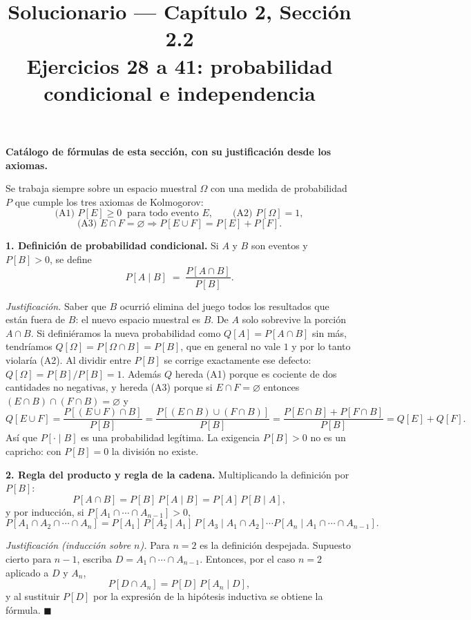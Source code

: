 \documentclass[11pt]{article}
\title{Solucionario --- Cap\'itulo 2, Secci\'on 2.2\\ Ejercicios 28 a 41: probabilidad condicional e independencia}
\author{}
\date{}
\begin{document}
\maketitle

\begin{teo}
\textbf{Cat\'alogo de f\'ormulas de esta secci\'on, con su justificaci\'on desde los axiomas.}

Se trabaja siempre sobre un espacio muestral $\Omega$ con una medida de probabilidad $P$ que cumple los tres axiomas de Kolmogorov:
\[
\text{(A1) } P[E]\ge 0 \ \text{ para todo evento } E,
\qquad
\text{(A2) } P[\Omega]=1,
\]
\[
\text{(A3) } E\cap F=\varnothing \Rightarrow P[E\cup F]=P[E]+P[F].
\]

\medskip
\textbf{1. Definici\'on de probabilidad condicional.} Si $A$ y $B$ son eventos y $P[B]>0$, se define
\[
P[A\mid B]\;=\;\frac{P[A\cap B]}{P[B]}.
\]

\emph{Justificaci\'on.} Saber que $B$ ocurri\'o elimina del juego todos los resultados que est\'an fuera de $B$: el nuevo espacio muestral es $B$. De $A$ solo sobrevive la porci\'on $A\cap B$. Si defini\'eramos la nueva probabilidad como $Q[A]=P[A\cap B]$ sin m\'as, tendr\'iamos $Q[\Omega]=P[\Omega\cap B]=P[B]$, que en general no vale $1$ y por lo tanto violar\'ia (A2). Al dividir entre $P[B]$ se corrige exactamente ese defecto: $Q[\Omega]=P[B]/P[B]=1$. Adem\'as $Q$ hereda (A1) porque es cociente de dos cantidades no negativas, y hereda (A3) porque si $E\cap F=\varnothing$ entonces $(E\cap B)\cap(F\cap B)=\varnothing$ y
\[
Q[E\cup F]=\frac{P[(E\cup F)\cap B]}{P[B]}=\frac{P[(E\cap B)\cup(F\cap B)]}{P[B]}=\frac{P[E\cap B]+P[F\cap B]}{P[B]}=Q[E]+Q[F].
\]
As\'i que $P[\cdot\mid B]$ es una probabilidad leg\'itima. La exigencia $P[B]>0$ no es un capricho: con $P[B]=0$ la divisi\'on no existe.

\medskip
\textbf{2. Regla del producto y regla de la cadena.} Multiplicando la definici\'on por $P[B]$:
\[
P[A\cap B]=P[B]\,P[A\mid B]=P[A]\,P[B\mid A],
\]
y por inducci\'on, si $P[A_1\cap\cdots\cap A_{n-1}]>0$,
\[
P[A_1\cap A_2\cap\cdots\cap A_n]
= P[A_1]\,P[A_2\mid A_1]\,P[A_3\mid A_1\cap A_2]\cdots P[A_n\mid A_1\cap\cdots\cap A_{n-1}].
\]

\emph{Justificaci\'on (inducci\'on sobre $n$).} Para $n=2$ es la definici\'on despejada. Supuesto cierto para $n-1$, escriba $D=A_1\cap\cdots\cap A_{n-1}$. Entonces, por el caso $n=2$ aplicado a $D$ y $A_n$,
\[
P[D\cap A_n]=P[D]\,P[A_n\mid D],
\]
y al sustituir $P[D]$ por la expresi\'on de la hip\'otesis inductiva se obtiene la f\'ormula. $\blacksquare$


\end{teo}
\end{document}
